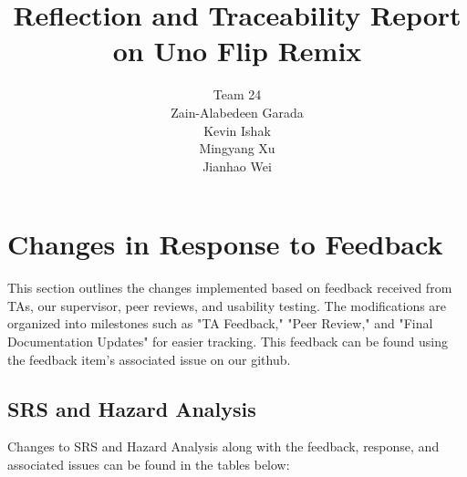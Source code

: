\documentclass{article}
\title{Reflection and Traceability Report on Uno Flip Remix}
\author{Team 24 \\Zain-Alabedeen Garada \\Kevin Ishak \\Mingyang Xu \\Jianhao Wei}
\date{}
\begin{document}
\maketitle


\section{Changes in Response to Feedback}
This section outlines the changes implemented based on feedback received from TAs, our supervisor, peer reviews, and usability testing. The modifications are organized into milestones such as "TA Feedback," "Peer Review," and "Final Documentation Updates" for easier tracking. This feedback can be found using the feedback item's associated issue on 
our github. 

\subsection{SRS and Hazard Analysis}

Changes to SRS and Hazard Analysis along with the feedback, response, and associated issues can be found in the tables below: 
\end{document}
